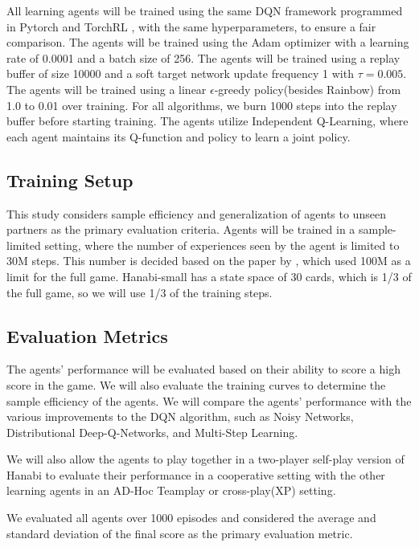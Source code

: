 All learning agents will be trained using the same DQN framework programmed in Pytorch and TorchRL \cite{bouTorchRLDatadrivenDecisionmaking2023}, with the same hyperparameters, to ensure a fair comparison. The agents will be trained using the Adam optimizer with a learning rate of 0.0001 and a batch size of 256. The agents will be trained using a replay buffer of size 10000 and a soft target network update frequency 1 with $\tau=0.005$. The agents will be trained using a linear $\epsilon$-greedy policy(besides Rainbow) from 1.0 to 0.01 over training. For all algorithms, we burn 1000 steps into the replay buffer before starting training.  The agents utilize Independent Q-Learning, where each agent maintains its Q-function and policy to learn a joint policy.

\subsection*{Training Setup}
This study considers sample efficiency and generalization of agents to unseen partners as the primary evaluation criteria. Agents will be trained in a sample-limited setting, where the number of experiences seen by the agent is limited to 30M steps. This number is decided based on the paper by \textcite{bardHanabiChallengeNew2020a}, which used 100M as a limit for the full game. Hanabi-small has a state space of 30 cards, which is 1/3 of the full game, so we will use 1/3 of the training steps.

\subsection*{Evaluation Metrics}
The agents' performance will be evaluated based on their ability to score a high score in the game. We will also evaluate the training curves to determine the sample efficiency of the agents. We will compare the agents' performance with the various improvements to the DQN algorithm, such as Noisy Networks, Distributional Deep-Q-Networks, and Multi-Step Learning.

We will also allow the agents to play together in a two-player self-play version of Hanabi to evaluate their performance in a cooperative setting with the other learning agents in an AD-Hoc Teamplay or cross-play(XP) setting.

We evaluated all agents over 1000 episodes and considered the average and standard deviation of the final score as the primary evaluation metric.
